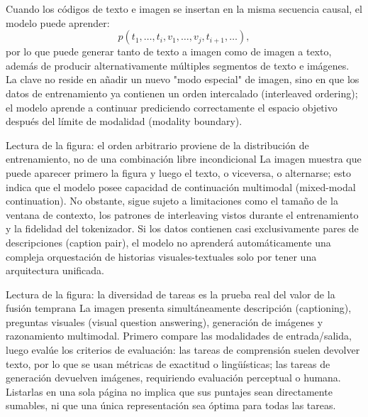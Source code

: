Cuando los códigos de texto e imagen se insertan en la misma secuencia causal, el modelo puede aprender:
$$
p(t_1,\ldots,t_i,v_1,\ldots,v_j,t_{i+1},\ldots),
$$
por lo que puede generar tanto de texto a imagen como de imagen a texto, además de producir alternativamente múltiples segmentos de texto e imágenes. La clave no reside en añadir un nuevo "modo especial" de imagen, sino en que los datos de entrenamiento ya contienen un orden intercalado (interleaved ordering); el modelo aprende a continuar prediciendo correctamente el espacio objetivo después del límite de modalidad (modality boundary).


\begin{knowledgebox}{Lectura de la figura: el orden arbitrario proviene de la distribución de entrenamiento, no de una combinación libre incondicional}
La imagen muestra que puede aparecer primero la figura y luego el texto, o viceversa, o alternarse; esto indica que el modelo posee capacidad de continuación multimodal (mixed-modal continuation). No obstante, sigue sujeto a limitaciones como el tamaño de la ventana de contexto, los patrones de interleaving vistos durante el entrenamiento y la fidelidad del tokenizador. Si los datos contienen casi exclusivamente pares de descripciones (caption pair), el modelo no aprenderá automáticamente una compleja orquestación de historias visuales-textuales solo por tener una arquitectura unificada.
\end{knowledgebox}


\begin{knowledgebox}{Lectura de la figura: la diversidad de tareas es la prueba real del valor de la fusión temprana}
La imagen presenta simultáneamente descripción (captioning), preguntas visuales (visual question answering), generación de imágenes y razonamiento multimodal. Primero compare las modalidades de entrada/salida, luego evalúe los criterios de evaluación: las tareas de comprensión suelen devolver texto, por lo que se usan métricas de exactitud o lingüísticas; las tareas de generación devuelven imágenes, requiriendo evaluación perceptual o humana. Listarlas en una sola página no implica que sus puntajes sean directamente sumables, ni que una única representación sea óptima para todas las tareas.
\end{knowledgebox}

